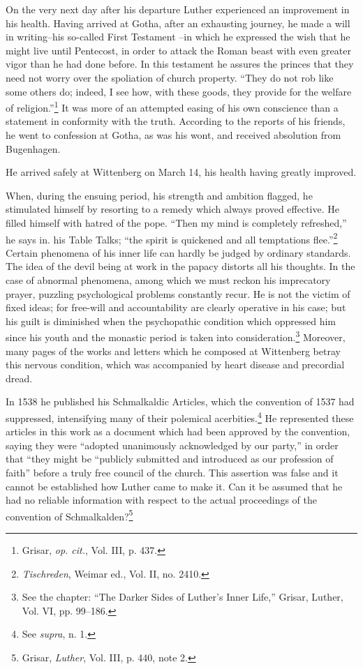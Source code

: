 On the very next day after his departure Luther experienced an
improvement in his health. Having arrived at Gotha, after an exhausting
journey, he made a will in writing--his so-called First Testament
--in which he expressed the wish that he might live until Pentecost, in
order to attack the Roman beast with even greater vigor
than he had done before. In this testament he assures the princes that
they need not worry over the spoliation of church property. “They
do not rob like some others do; indeed, I see how, with these goods,
they provide for the welfare of religion.”\footnote{Grisar, \textit{op. cit.}, Vol. III, p. 437.}
It was more of an attempted
easing of his own conscience than a statement in conformity
with the truth. According to the reports of his friends, he went to
confession at Gotha, as was his wont, and received absolution from
Bugenhagen.

He arrived safely at Wittenberg on March 14, his health having
greatly improved.

When, during the ensuing period, his strength and ambition
flagged, he stimulated himself by resorting to a remedy which always
proved effective. He filled himself with hatred of the pope. “Then
my mind is completely refreshed,” he says in. his Table Talks; “the
spirit is quickened and all temptations flee.”\footnote{\textit{Tischreden}, Weimar ed., Vol. II, no. 2410.}
Certain phenomena of
his inner life can hardly be judged by ordinary standards. The idea
of the devil being at work in the papacy distorts all his thoughts. In
the case of abnormal phenomena, among which we must reckon his
imprecatory prayer, puzzling psychological problems constantly recur.
He is not the victim of fixed ideas; for free-will and accountability
are clearly operative in his case; but his guilt is diminished when
the psychopathic condition which oppressed him since his youth and
the monastic period is taken into consideration.\footnote
{See the chapter: “The Darker Sides of Luther’s Inner Life,” Grisar, Luther, Vol. VI,
pp. 99--186.}
Moreover, many
pages of the works and letters which he composed at Wittenberg betray
this nervous condition, which was accompanied by heart disease
and precordial dread.

In 1538 he published his Schmalkaldic Articles, which the convention of
1537 had suppressed, intensifying many of their polemical
acerbities.\footnote{See \textit{supra}, n. 1.}
He represented these articles in this work as a document
which had been approved by the convention, saying they were
“adopted unanimously acknowledged by our party,” in order that
“they might be “publicly submitted and introduced as our profession
of faith” before a truly free council of the church. This assertion was
false and it cannot be established how Luther came to make it. Can it
be assumed that he had no reliable information with respect to the
actual proceedings of the convention of Schmalkalden?\footnote{Grisar, \textit{Luther}, Vol. III, p. 440, note 2.}


